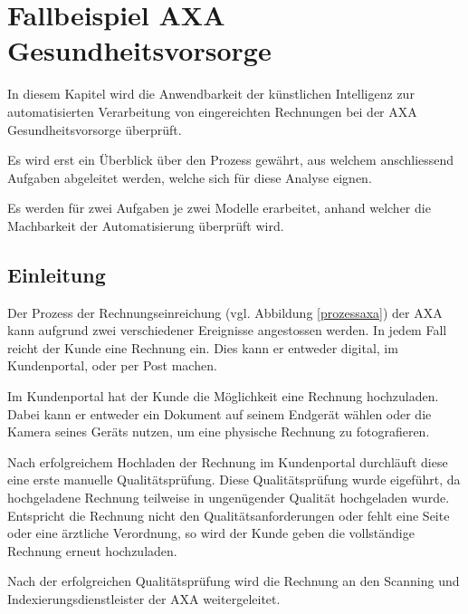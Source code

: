\section{Fallbeispiel AXA Gesundheitsvorsorge}

In diesem Kapitel wird die Anwendbarkeit der künstlichen Intelligenz zur automatisierten Verarbeitung von eingereichten Rechnungen bei der AXA Gesundheitsvorsorge überprüft.

Es wird erst ein Überblick über den Prozess gewährt, aus welchem anschliessend Aufgaben abgeleitet werden, welche sich für diese Analyse eignen.

Es werden für zwei Aufgaben je zwei Modelle erarbeitet, anhand welcher die Machbarkeit der Automatisierung überprüft wird.

\subsection{Einleitung}


Der Prozess der Rechnungseinreichung (vgl. Abbildung \ref{prozessaxa}) der AXA kann aufgrund zwei verschiedener Ereignisse angestossen werden. In jedem Fall reicht der Kunde eine Rechnung ein. Dies kann er entweder digital, im Kundenportal, oder per Post machen. 

Im Kundenportal hat der Kunde die Möglichkeit eine Rechnung hochzuladen. Dabei kann er entweder ein Dokument auf seinem Endgerät wählen oder die Kamera seines Geräts nutzen, um eine physische Rechnung zu fotografieren.

Nach erfolgreichem Hochladen der Rechnung im Kundenportal durchläuft diese eine erste manuelle Qualitätsprüfung. Diese Qualitätsprüfung wurde eigeführt, da hochgeladene Rechnung teilweise in ungenügender Qualität hochgeladen wurde. Entspricht die Rechnung nicht den Qualitätsanforderungen oder fehlt eine Seite oder eine ärztliche Verordnung, so wird der Kunde geben die vollständige Rechnung erneut hochzuladen.

Nach der erfolgreichen Qualitätsprüfung wird die Rechnung an den Scanning und Indexierungsdienstleister der AXA weitergeleitet.

